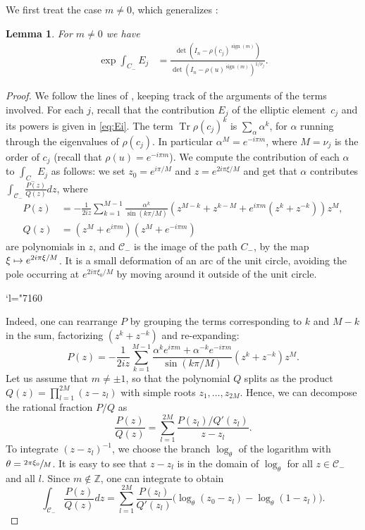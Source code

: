 \documentclass[JEP,XML,SOM,Unicode,NoFloatCountersInSection,published]{cedram}
\newcommand{\Changel}{\mathcode`l="7160}
\newcommand\mto{\mathchoice{\longmapsto}{\mapsto}{\mapsto}{\mapsto}}
\theoremstyle{plain}
\newtheorem{lem}[thm]{Lemma}
\theoremstyle{definition}
\theoremstyle{remark}
\newcommand{\Z}{\mathbb{Z}}
\DeclareMathOperator{\Tr}{Tr}
\DeclareMathOperator{\sign}{sign}
\numberwithin{equation}{section}
\begin{document}
We first treat the case $m\neq0$, which generalizes \cite[Lem.\,5]{fried1986fuchsian}:

\begin{lem}
\label{lem2}
For $m\neq0$ we have
\begin{align}
\label{eq:elliptic}
\exp \int_{C_-} E_j &= \frac {\det(I_n-\rho(c_j)^{\sign(m)})}{\det(I_n-\rho(u)^{\sign(m)})^{1/\nu_j} }.
\end{align}
\end{lem}
\begin{proof}
We follow the lines of \cite[proof of Lem.\,5]{fried1986fuchsian}, keeping track of the arguments of the terms involved.
For each $j$, recall that the contribution $E_j$ of the elliptic element~$c_j$ and its powers is given in \cref{eq:Ei}. The term $\Tr \rho(c_j)^k$ is $\sum_\alpha \alpha^k$, for $\alpha$ running through the eigenvalues of $\rho(c_j)$. In particular $\alpha^M = e^{-i\pi m}$, where $M = \nu_j$ is the order of $c_j$ (recall that $\rho(u) = e^{-i\pi m}$). We compute the contribution of each $\alpha$ to $\int_{C_-}E_j$ as follows:
we set $z_0 = e^{i\pi/M}$ and $z = e^{2i\pi \xi/M}$ and get that $\alpha$ contributes
$\int_{\mathcal C_-} \frac{P(z)}{Q(z)} dz$, where
\begin{align*}
P(z) &= - \frac 1 {2iz} \sum_{k=1}^{M-1} \frac {\alpha^k}{\sin(k\pi/M)} (z^{M-k}+z^{k-M} + e^{i\pi m} (z^k+z^{-k})) z^M,\\
Q(z) &= (z^M + e^{i\pi m})(z^M + e^{-i\pi m})
\end{align*}
are polynomials in $z$, and $\mathcal C_-$ is the image of the path $C_-$, by the map $\xi \mto e^{2i\pi \xi/M}$. It is a small deformation of an arc of the unit circle, avoiding the pole occurring at $e^{2i\pi \xi_0/M}$ by moving around it outside of the unit circle.

\Changel

Indeed, one can rearrange $P$ by grouping the terms corresponding to $k$ and $M-k$ in the sum, factorizing $(z^k + z^{-k})$ and re-expanding:
\[
P(z) = - \frac 1 {2iz} \sum_{k=1}^{M-1} \frac {\alpha^k e^{i\pi m} + \alpha^{-k}e^{-i\pi m}}{\sin(k\pi/M)} (z^k+z^{-k}) z^M.
\]
Let us assume that $m \neq \pm 1$, so that the polynomial $Q$ splits as the product $Q(z) = \prod_{l=1}^{2M} (z-z_l)$ with simple roots $z_1,\ldots,z_{2M}$. Hence, we can decompose the rational fraction $P/Q$ as
\[
\frac{P(z)}{Q(z)} = \sum_{l=1}^{2M} \frac{P(z_l)/Q'(z_l)}{z-z_l}.
\]
To integrate $(z-z_l)^{-1}$, we choose the branch $\log\nolimits_\theta$ of the logarithm with $\theta=\sfrac{2\pi\xi_0}{M}$. It is easy to see that $z-z_l$ is in the domain of $\log\nolimits_\theta$ for all $z\in\mathcal C_-$ and all $l$. Since $m \notin \Z$, one can integrate to obtain
\begin{equation}
\int_{\mathcal C_-} \frac{P(z)}{Q(z)}dz= \sum_{l=1}^{2M} \frac {P(z_l)}{Q'(z_l)} \big(\log\nolimits_\theta(z_0-z_l)-\log\nolimits_\theta(1-z_l)\big).\label{eq:IntPoverQ}
\end{equation}


\end{proof}
\end{document}
